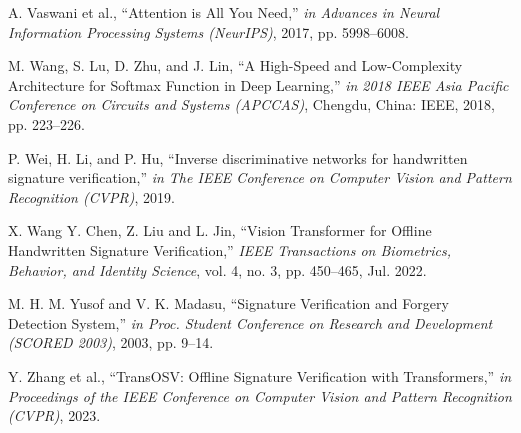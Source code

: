 \begin{thebibliography}{10}
A. Vaswani et al., ``Attention is All You Need,'' {\em in Advances in Neural Information Processing Systems (NeurIPS)},
2017, pp. 5998--6008.

M. Wang, S. Lu, D. Zhu, and J. Lin, ``A High-Speed and Low-Complexity Architecture for Softmax Function in Deep Learning,'' {\em in 2018 IEEE Asia Pacific Conference on Circuits and Systems (APCCAS)}, Chengdu, China: IEEE,
2018, pp. 223--226.

P. Wei, H. Li, and P. Hu, ``Inverse discriminative networks for handwritten signature verification,'' {\em in The IEEE Conference on Computer Vision and Pattern Recognition (CVPR)},
2019.

X. Wang Y. Chen, Z. Liu and L. Jin, ``Vision Transformer for Offline Handwritten Signature Verification,'' {\em IEEE Transactions on Biometrics, Behavior, and Identity Science}, vol. 4, no. 3, pp. 450--465,
Jul. 2022.

M. H. M. Yusof and V. K. Madasu, ``Signature Verification and Forgery Detection System,'' {\em in Proc. Student Conference on Research and Development (SCORED 2003)},
2003, pp. 9--14.

Y. Zhang et al., ``TransOSV: Offline Signature Verification with Transformers,'' {\em in Proceedings of the IEEE Conference on Computer Vision and Pattern Recognition (CVPR)},
2023.


\end{thebibliography}




























